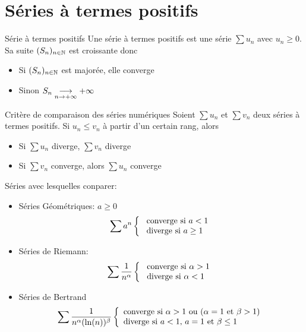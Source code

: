 \documentclass[]{report}
\begin{document}
\section{Séries à termes positifs}

\begin{df}{Série à termes positifs}{}
    Une série à termes positifs est une série $\sum u_n$ avec $u_n \ge 0$. Sa suite $(S_n)_{n\in\mathbb{N}}$ est croissante donc
    \begin{itemize}
        \item Si $(S_n)_{n\in\mathbb{N}}$ est majorée, elle converge
        \item Sinon $S_n\underset{n\to +\infty}{\longrightarrow} +\infty$
    \end{itemize}
\end{df}

\begin{prop}{Critère de comparaison des séries numériques}{}
    Soient $\sum u_n$ et $\sum v_n$ deux séries à termes positifs. Si $u_n\le v_n$ à partir d'un certain rang, alors
    \begin{itemize}
        \item Si $\sum u_n$ diverge, $\sum v_n$ diverge
        \item Si $\sum v_n$ converge, alors $\sum u_n$ converge
    \end{itemize}
    Séries avec lesquelles conparer:
    \begin{itemize}
        \item Séries Géométriques: $a\ge 0$
              \[\sum a^n \left\{\begin{array}{ll} \text{ converge si }a<1\\ \text{ diverge si }a \ge 1 \end{array} \right.\]
        \item Séries de Riemann:
              \[\sum \frac{1}{n^{\alpha}}\left\{\begin{array}{ll} \text{ converge si }\alpha>1\\ \text{ diverge si }\alpha < 1 \end{array} \right.\]
        \item Séries de Bertrand
              \[\sum \frac{1}{n^\alpha (\ln (n))^\beta}\left\{\begin{array}{ll} \text{converge si }\alpha>1 \text{ ou }(\alpha=1 \text{ et } \beta >1)\\ \text{diverge si $a<1$, $a=1$ et $\beta \le 1$} \end{array} \right.\]
    \end{itemize}
\end{prop}
\end{document}
